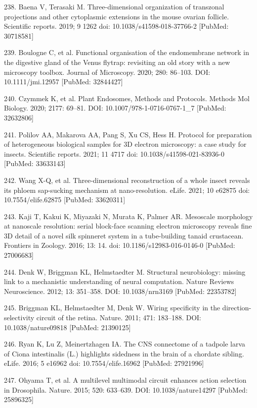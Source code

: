 \documentclass{article}
\begin{document}
\begin{hangpars}
238. Baena V, Terasaki M. Three-dimensional organization of transzonal projections and other cytoplasmic extensions in the mouse ovarian follicle. Scientific reports. 2019; 9 1262 doi: 10.1038/s41598-018-37766-2 [PubMed: 30718581]

239. Boulogne C, et al. Functional organisation of the endomembrane network in the digestive gland of the Venus flytrap: revisiting an old story with a new microscopy toolbox. Journal of Microscopy. 2020; 280: 86–103. DOI: 10.1111/jmi.12957 [PubMed: 32844427]

240. Czymmek K, et al. Plant Endosomes, Methods and Protocols. Methods Mol Biology. 2020; 2177: 69–81. DOI: 10.1007/978-1-0716-0767-1\_7 [PubMed: 32632806]

241. Polilov AA, Makarova AA, Pang S, Xu CS, Hess H. Protocol for preparation of heterogeneous biological samples for 3D electron microscopy: a case study for insects. Scientific reports. 2021; 11 4717 doi: 10.1038/s41598-021-83936-0 [PubMed: 33633143]

242. Wang X-Q, et al. Three-dimensional reconstruction of a whole insect reveals its phloem sap-sucking mechanism at nano-resolution. eLife. 2021; 10 e62875 doi: 10.7554/elife.62875 [PubMed: 33620311]

243. Kaji T, Kakui K, Miyazaki N, Murata K, Palmer AR. Mesoscale morphology at nanoscale resolution: serial block-face scanning electron microscopy reveals fine 3D detail of a novel silk spinneret system in a tube-building tanaid crustacean. Frontiers in Zoology. 2016; 13: 14. doi: 10.1186/s12983-016-0146-0 [PubMed: 27006683]

244. Denk W, Briggman KL, Helmstaedter M. Structural neurobiology: missing link to a mechanistic understanding of neural computation. Nature Reviews Neuroscience. 2012; 13: 351–358. DOI: 10.1038/nrn3169 [PubMed: 22353782]

245. Briggman KL, Helmstaedter M, Denk W. Wiring specificity in the direction-selectivity circuit of the retina. Nature. 2011; 471: 183–188. DOI: 10.1038/nature09818 [PubMed: 21390125]

246. Ryan K, Lu Z, Meinertzhagen IA. The CNS connectome of a tadpole larva of Ciona intestinalis (L.) highlights sidedness in the brain of a chordate sibling. eLife. 2016; 5 e16962 doi: 10.7554/elife.16962 [PubMed: 27921996]

247. Ohyama T, et al. A multilevel multimodal circuit enhances action selection in Drosophila. Nature. 2015; 520: 633–639. DOI: 10.1038/nature14297 [PubMed: 25896325]


\end{hangpars}
\end{document}
